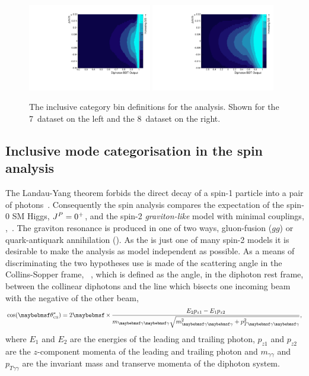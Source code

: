 \begin{figure}
  \includegraphics[width=0.48\textwidth]{selec_and_cats/plots/sideband_cats_7TeV_fix.pdf}
  \includegraphics[width=0.48\textwidth]{selec_and_cats/plots/sideband_cats_8TeV_fix.pdf}
  \caption[The inclusive category bin definitions for the \acs{SMVA} analysis]{The inclusive category bin definitions for the \SMVA analysis. Shown for the 7~\TeV dataset on the left and the 8~\TeV dataset on the right.}
  \label{fig:sideband_cats}
\end{figure}

\subsection{Inclusive mode categorisation in the spin analysis}
\label{sec:spin_cats}

The Landau-Yang theorem forbids the direct decay of a spin-1 particle into a pair of photons~\cite{Landau1948,Yang1950}. 
Consequently the spin analysis compares the expectation of the spin-0 SM Higgs, $J^{P}=0^{+}$, and the spin-2 \emph{graviton-like} 
model with minimal couplings, \twomp,~\cite{Gao2010}. The \twomp graviton resonance is produced in one of two ways, gluon-fusion ($gg$) 
or quark-antiquark annihilation (\qqbar). As the \twomp is just one of many spin-2 models it is desirable to make the analysis as model independent as possible. As a means of 
discriminating the two hypotheses use is made of the scattering angle in the Collins-Sopper frame, \costhetastar ~\cite{CollinsSoper1977}, which is defined as the angle, in the diphoton rest frame, between the collinear diphotons 
and the line which bisects one incoming beam with the negative of the other beam, 
\begin{equation}
  \cos(\theta^{\ast}_{\mbox{\tiny{CS}}}) = 2\times\frac{E_{2}p_{z1}-E_{1}p_{z2}}{m_{\gamma\gamma}\sqrt{m^{2}_{\gamma\gamma}+p^{2}_{T\gamma\gamma}}},
  \label{eq:costheta}
\end{equation}
where $E_{1}$ and $E_{2}$ are the energies of the leading and trailing photon, $p_{z1}$ and $p_{z2}$ are the $z$-component momenta 
of the leading and trailing photon and $m_{\gamma\gamma}$ and $p_{T\gamma\gamma}$ are the invariant mass and transerve momenta of the diphoton system.

